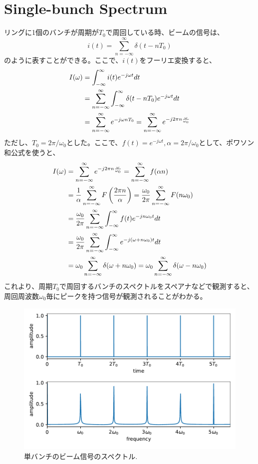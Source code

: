\documentclass[]{jlreq}
\theoremstyle{definition}
\begin{document}
\section{Single-bunch Spectrum}
リングに1個のバンチが周期が$T_0$で周回している時、ビームの信号は、
%
\begin{equation}
  i(t) = \sum_{n=-\infty}^{\infty} \delta (t - n T_0 ) 
\end{equation}
%
のように表すことができる。ここで、$i(t)$をフーリエ変換すると、
%
\begin{align}
  I(\omega) &= \int_{-\infty}^{\infty} i(t) e^{-j \omega t} dt \notag \\
    &= \sum_{n=-\infty}^{\infty} \int_{-\infty}^{\infty} \delta (t - n T_0 ) e^{-j \omega t} dt \notag \\ 
    &= \sum_{n=-\infty}^{\infty} e^{-j\omega n T_0} = \sum_{n=-\infty}^{\infty} e^{-j 2\pi n \frac{\omega}{\omega_0}}
\end{align}
%
ただし、$T_0 = 2\pi / \omega_0$とした。ここで、$f(t) = e^{-j\omega t}, \alpha = 2\pi /\omega_0$として、ポワソン和公式を使うと、
%
\begin{align}
  I(\omega) &= \sum_{n=-\infty}^{\infty} e^{-j 2\pi n \frac{\omega}{\omega_0}} = \sum_{n=-\infty}^{\infty} f(\alpha n)\notag \\
    &= \frac{1}{\alpha} \sum_{n=-\infty}^{\infty} F\left( \frac{2 \pi n}{\alpha}\right) 
    = \frac{\omega_0}{2\pi} \sum_{n=-\infty}^{\infty} F(n \omega_0) \notag \\
    &= \frac{\omega_0}{2\pi} \sum_{n=-\infty}^{\infty} \int_{-\infty}^{\infty} f(t) e^{-j n \omega_0 t} dt \notag \\
    &= \frac{\omega_0}{2\pi} \sum_{n=-\infty}^{\infty} \int_{-\infty}^{\infty} e^{-j (\omega + n \omega_0) t} dt \notag \\
    &= \omega_0 \sum_{n=-\infty}^{\infty} \delta(\omega + n \omega_0) = \omega_0 \sum_{n=-\infty}^{\infty} \delta(\omega - n \omega_0)
\end{align}
%
これより、周期$T_0$で周回するバンチのスペクトルをスペアナなどで観測すると、周回周波数$\omega_0$毎にピークを持つ信号が観測されることがわかる。
%
\begin{figure}[hbt]
  \begin{center}
    \includegraphics[width=12cm,clip]{single_bunch.pdf}
    \caption{単バンチのビーム信号のスペクトル.}
   \label{single_bunch}
  \end{center}
\end{figure}
%
\end{document}
